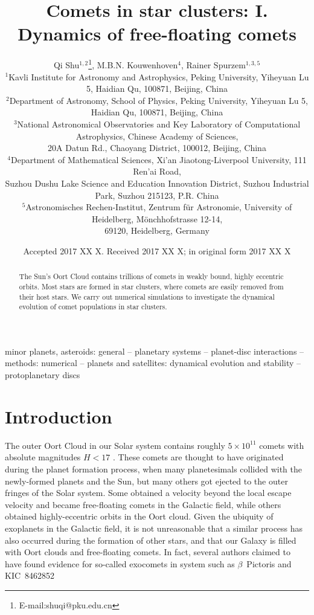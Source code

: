 \documentclass[usenatbib]{mn2e}
\title[Comets in star clusters: I. Dynamics of free-floating comets]{Comets in star clusters: I. Dynamics of free-floating comets}
\author[Qi Shu et al.]{Qi Shu$^{1,2}$\thanks{E-mail:shuqi@pku.edu.cn}, M.B.N. Kouwenhoven$^{4}$, Rainer Spurzem$^{1,3,5}$\\
  $^{1}$Kavli Institute for Astronomy and Astrophysics, Peking University, Yiheyuan Lu 5, Haidian Qu, 100871, Beijing, China\\
  $^{2}$Department of Astronomy, School of Physics, Peking University, Yiheyuan Lu 5, Haidian Qu, 100871, Beijing, China\\
  $^{3}$National Astronomical Observatories and Key Laboratory of Computational Astrophysics, Chinese Academy of Sciences, \\
  20A Datun Rd., Chaoyang District, 100012, Beijing, China\\ 
  $^{4}$Department of Mathematical Sciences, Xi'an Jiaotong-Liverpool University, 111 Ren'ai Road, \\
  Suzhou Dushu Lake Science and Education Innovation District, Suzhou Industrial Park, Suzhou 215123, P.R. China \\
  $^{5}$Astronomisches Rechen-Institut, Zentrum f\"ur Astronomie, University of Heidelberg, M\"onchhofstrasse 12-14, \\
69120, Heidelberg, Germany \\
}
\begin{document}
\date{Accepted 2017 XX X. Received 2017 XX X; in original form 2017 XX X}

  

\maketitle

\label{firstpage}

\begin{abstract}
The Sun's Oort Cloud contains trillions of comets in weakly bound, highly eccentric orbits. Most stars are formed in star clusters, where comets are easily removed from their host stars. We carry out numerical simulations to investigate the dynamical evolution of comet populations in star clusters.


\end{abstract}

\begin{keywords}
minor planets, asteroids: general -- planetary systems -- planet-disc interactions -- methods: numerical -- planets and satellites: dynamical evolution and stability -- protoplanetary discs
\end{keywords}

\section{Introduction}

The outer Oort Cloud in our Solar system contains roughly $5 \times10^{11}$ comets with absolute magnitudes $H < 17$ \citep{Francis:2005aa}. These comets are thought to have originated during the planet formation process, when many planetesimals collided with the newly-formed planets and the Sun, but many others got ejected to the outer fringes of the Solar system. Some obtained a velocity beyond the local escape velocity and became free-floating comets in the Galactic field, while others obtained highly-eccentric orbits in the Oort cloud. Given the ubiquity of exoplanets in the Galactic field, it is not unreasonable that a similar process has also occurred during the formation of other stars, and that our Galaxy is filled with Oort clouds and free-floating comets. In fact, several authors claimed to have found evidence for so-called exocomets in system such as $\beta$~Pictoris \citep[e.g.,][and references therein]{Welsh:2016aa} and KIC~8462852 \citep[e.g.,][and references therein]{Bodman:2016aa, Boyajian:2016aa}
\end{document}
